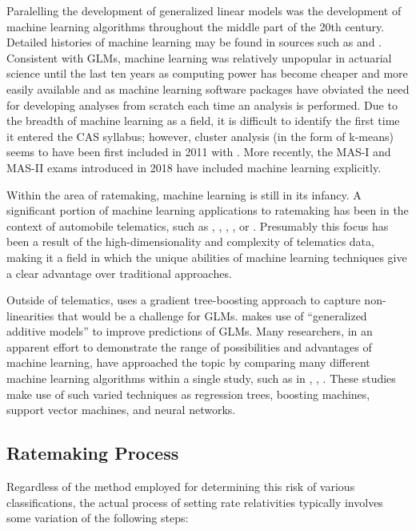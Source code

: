\documentclass[]{interact}
\theoremstyle{plain}%
\theoremstyle{definition}
\theoremstyle{remark}
\begin{document}
Paralelling the development of generalized linear models was the
development of machine learning algorithms throughout the middle part of
the 20th century. Detailed histories of machine learning may be found in
sources such as \citep{Nilsson_2009} and \citep{wang_raj_2017}.
Consistent with GLMs, machine learning was relatively unpopular in
actuarial science until the last ten years as computing power has become
cheaper and more easily available and as machine learning software
packages have obviated the need for developing analyses from scratch
each time an analysis is performed. Due to the breadth of machine
learning as a field, it is difficult to identify the first time it
entered the CAS syllabus; however, cluster analysis (in the form of
k-means) seems to have been first included in 2011 with
\citep{robertson_2009}. More recently, the MAS-I and MAS-II exams
introduced in 2018 have included machine learning explicitly.

Within the area of ratemaking, machine learning is still in its infancy.
A significant portion of machine learning applications to ratemaking has
been in the context of automobile telematics, such as \citep{gao_2018},
\citep{gao_2018_2}, \citep{gao_2019}, \citep{roel_2018}, or
\citep{wuthrich_2017}. Presumably this focus has been a result of the
high-dimensionality and complexity of telematics data, making it a field
in which the unique abilities of machine learning techniques give a
clear advantage over traditional approaches.

Outside of telematics, \citep{yang_2018} uses a gradient tree-boosting
approach to capture non-linearities that would be a challenge for GLMs.
\citep{henckaerts_2018} makes use of ``generalized additive models'' to
improve predictions of GLMs. Many researchers, in an apparent effort to
demonstrate the range of possibilities and advantages of machine
learning, have approached the topic by comparing many different machine
learning algorithms within a single study, such as in
\citep{dugas_2003}, \citep{noll_2018}, \citep{spedicato_2018}. These
studies make use of such varied techniques as regression trees, boosting
machines, support vector machines, and neural networks.

\subsection{Ratemaking Process}\label{ratemaking-process}

Regardless of the method employed for determining this risk of various
classifications, the actual process of setting rate relativities
typically involves some variation of the following steps:
\end{document}
